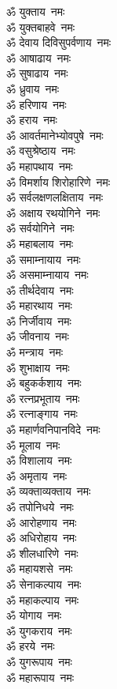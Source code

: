 \begin{multicols}{2}
\begin{flushleft}
ॐ युक्ताय~नमः\\
ॐ युक्तबाहवे~नमः\\
ॐ देवाय दिविसुपर्वणाय~नमः\\
ॐ आषाढाय~नमः\\
ॐ सुषाढाय~नमः\hfill{}\\
ॐ ध्रुवाय~नमः\\
ॐ हरिणाय~नमः\\
ॐ हराय~नमः\\
ॐ आवर्तमानेभ्योवपुषे~नमः\\
ॐ वसुश्रेष्ठाय~नमः\\
ॐ महापथाय~नमः\\
ॐ विमर्शाय शिरोहारिणे~नमः\\
ॐ सर्वलक्षणलक्षिताय~नमः\\
ॐ अक्षाय रथयोगिने~नमः\\
ॐ सर्वयोगिने~नमः\hfill{}\\
ॐ महाबलाय~नमः\\
ॐ समाम्नायाय~नमः\\
ॐ असमाम्नायाय~नमः\\
ॐ तीर्थदेवाय~नमः\\
ॐ महारथाय~नमः\\
ॐ निर्जीवाय~नमः\\
ॐ जीवनाय~नमः\\
ॐ मन्त्राय~नमः\\
ॐ शुभाक्षाय~नमः\\
ॐ बहुकर्कशाय~नमः\hfill{}\\
ॐ रत्नप्रभूताय~नमः\\
ॐ रत्नाङ्गाय~नमः\\
ॐ महार्णवनिपानविदे~नमः\\
ॐ मूलाय~नमः\\
ॐ विशालाय~नमः\\
ॐ अमृताय~नमः\\
ॐ व्यक्ताव्यक्ताय~नमः\\
ॐ तपोनिधये~नमः\\
ॐ आरोहणाय~नमः\\
ॐ अधिरोहाय~नमः\hfill{}\\
ॐ शीलधारिणे~नमः\\
ॐ महायशसे~नमः\\
ॐ सेनाकल्पाय~नमः\\
ॐ महाकल्पाय~नमः\\
ॐ योगाय~नमः\\
ॐ युगकराय~नमः\\
ॐ हरये~नमः\\
ॐ युगरूपाय~नमः\\
ॐ महारूपाय~नमः\\

\end{flushleft}
\end{multicols}

